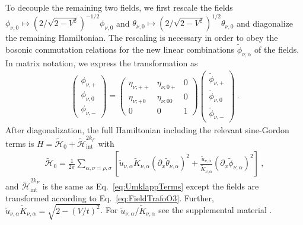\documentclass[twocolumn, prl, aps, floatfix, superscriptaddress, longbibliography]{revtex4-1}
\begin{document}
To decouple the remaining two fields, we first rescale the fields $\phi_{\nu,0}\mapsto \left(2/\sqrt{2-V^2}\right)^{-1/2} \phi_{\nu,0}$ and $\theta_{\nu,0}\mapsto \left(2/\sqrt{2-V^2}\right)^{1/2} \theta_{\nu,0}$ and diagonalize the remaining Hamiltonian. The rescaling is necessary in order to obey the bosonic commutation relations for the new linear combinations $\tilde{\phi}_{\nu,\alpha}$ of the fields. In matrix notation, we express the transformation as
%
\begin{align} \label{eq:FieldTrafoO3}
	\left(\begin{array}{c}
		\phi_{\nu,+} \\
		\phi_{\nu,0}  \\
		\phi_{\nu,-} 
	\end{array}\right)
	= \left(
		\begin{array}{ccc}
			\eta_{\nu;++} & \eta_{\nu;0+} & 0 \\
			\eta_{\nu;+0} & \eta_{\nu;00} & 0 \\
			0 & 0 & 1
		\end{array}
		\right)
	\left(\begin{array}{c}
		\tilde{\phi}_{\nu,+} \\
		\tilde{\phi}_{\nu,0} \\
		\tilde{\phi}_{\nu,-}
	\end{array}\right) \ .
\end{align}
%
After diagonalization, the full Hamiltonian including the relevant sine-Gordon terms is $H  = \tilde{\mathcal{H}}_0 + \tilde{\mathcal{H}}_{\text{int}}^{2k_F}$ with
%
\begin{align} \label{eq:FinalDiagonalHamiltonian}
	\tilde{\mathcal{H}}_0 = \frac{1}{2\pi}\sum_{\alpha,\nu = \rho,\sigma}  \left[ \tilde{u}_{\nu,\alpha}\tilde{K}_{\nu,\alpha}\left(\partial_x \tilde{\theta}_{\nu, \alpha}\right)^2 + \frac{\tilde{u}_{\nu,\alpha}}{\tilde{K}_{\nu,\alpha}} \left(\partial_x \tilde{\phi}_{\nu, \alpha}\right)^2\right] \ ,
\end{align}
%
and $\tilde{\mathcal{H}}^{2k_F}_{\text{int}}$ is the same as Eq.~\eqref{eq:UmklappTerms} except the fields are transformed according to Eq.~\eqref{eq:FieldTrafoO3}. Further, $\tilde{u}_{\nu,\alpha}\tilde{K}_{\nu,\alpha} = \sqrt{2-(V/t)^2}$. For $\tilde{u}_{\nu,\alpha}/\tilde{K}_{\nu,\alpha}$ see the supplemental material \cite{supp}. 
\end{document}
